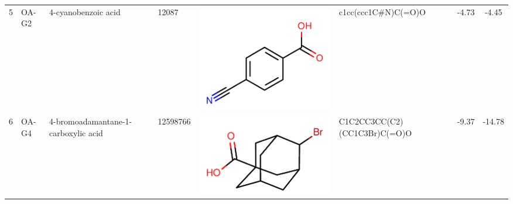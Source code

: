 \documentclass[aps,pre,twocolumn,nofootinbib,superscriptaddress,10pt, final,tightenlines]{revtex4-1}
\begin{document}
\begin{table}
\begin{tabular}{llllp{1.5cm}>{\ttfamily}lS[table-format=-1.3, table-figures-uncertainty=1]S[table-format=-1.2, table-figures-uncertainty=1]}
5 & OA-G2    & 4-cyanobenzoic acid                 & 12087            & \parbox[c]{1em}{\includegraphics[scale=0.15]{figures/12087.pdf}}    & c1cc(ccc1C\#N)C(=O)O            & -4.73      & -4.45      \\
6 & OA-G4    & 4-bromoadamantane-1-carboxylic acid & 12598766         & \parbox[c]{1em}{\includegraphics[scale=0.15]{figures/12598766.pdf}} & C1C2CC3CC(C2)(CC1C3Br)C(=O)O       & -9.37      & -14.78     \\  

\end{tabular}
\end{table}
\end{document}
